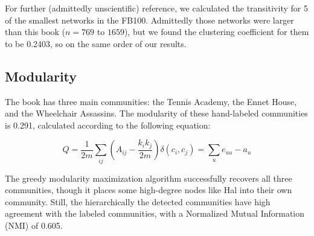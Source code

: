 For further (admittedly unscientific) reference, we calculated the transitivity for 5 of the smallest networks in the FB100. Admittedly those networks were larger than this book ($n=769$ to $1659$), but we found the clustering coefficient for them to be 0.2403, so on the same order of our results.

\subsection{Modularity}
The book has three main communities: the Tennis Academy, the Ennet House, and the Wheelchair Assassins. The modularity of these hand-labeled communities is 0.291, calculated according to the following equation:

$$Q = \frac{1}{2m}\sum_{ij} \left(A_{ij} - \frac{k_ik_j}{2m} \right) \delta(c_i,c_j) = \sum_u e_{uu} - a_u $$

The greedy modularity maximization algorithm successfully recovers all three communities, though it places some high-degree nodes like Hal into their own community. Still, the hierarchically the detected communities have high agreement with the labeled communities, with a Normalized Mutual Information (NMI) of 0.605.

